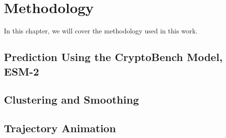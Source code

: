 \chapter{Methodology}
\label{chap:methodology}
In this chapter, we will cover the methodology used in this work.

\section{Prediction Using the CryptoBench Model, ESM-2}
\label{sec:prediction}


\section{Clustering and Smoothing}
\label{sec:clustering}


\section{Trajectory Animation}
\label{sec:trajectory}

